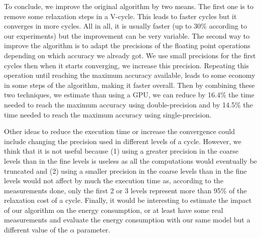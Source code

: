 \documentclass[10pt,conference]{IEEEtran}
\begin{document}
   To conclude, we improve the original algorithm by two means. The first one is to remove some relaxation steps in a V-cycle. This leads to faster cycles but it converges in more cycles. All in all,
   it is usually faster (up to 30\% according to our experiments) but the improvement can be very variable. The second way to improve the algorithm is to adapt the precisions of the floating point
   operations depending on which accuracy we already got. We use small precisions for the first cycles then when it starts converging, we increase this precision. Repeating this operation until reaching the maximum accuracy available, leads
   to some economy in some steps of the algorithm, making it faster overall. Then by combining these two techniques, we estimate than using a GPU, we can reduce by 16.4\% the time needed to reach the maximum accuracy using double-precision and by 14.5\% the time needed
   to reach the maximum accuracy using single-precision.
   
   Other ideas to reduce the execution time or increase the convergence could include changing the precision used in different levels of a cycle. However, we think that it is not
   useful because (1) using a greater precision in the coarse levels than in the fine levels is useless as all the computations would eventually be truncated and (2) using a smaller
   precision in the coarse levels than in the fine levels would not affect by much the execution time as, according to the measurements done, only the first 2 or 3 levels represent more than 95\% of the relaxation cost of a cycle.
   Finally, it would be interesting to estimate the impact of our algorithm on the energy consumption, or at least have some real measurements and evaluate the energy consumption with our
   same model but a different value of the $\alpha$ parameter.
   
   
   
\end{document}
